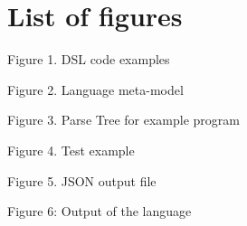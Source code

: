 \chapter*{List of figures}

Figure 1. DSL code examples

Figure 2. Language meta-model

Figure 3. Parse Tree for example program

Figure 4. Test example

Figure 5. JSON output file

Figure 6: Output of the language